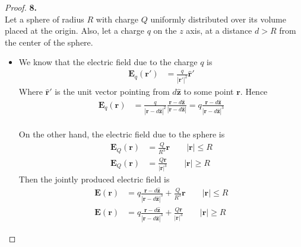 \documentclass[11pt]{article}
\newcommand{\hatz}{\bm{\hat{z}}}
\newcommand{\hatr}{\bm{\hat{r}}}
\theoremstyle{definition}
\begin{document}
\cleardoublepage
\begin{proof}{\textbf{8.}}\\
Let a sphere of radius $R$ with charge $Q$ uniformly distributed over its
volume placed at the origin. Also, let a charge $q$ on the $z$ axis, at a
distance $d > R$ from the center of the sphere.
\begin{itemize}
\item [(a)] We know that the electric field due to the charge $q$ is
\begin{align*}
    \bm{E}_q(\bm{r}') &= \frac{q}{|\bm{r}'|^2}\hatr'
\end{align*}
Where $\hatr'$ is the unit vector pointing from $d\hatz$ to some point $\bm{r}$.
Hence
\begin{align*}
    \bm{E}_q(\bm{r})
    &= \frac{q}{|\bm{r} - d\hatz|^2}\frac{\bm{r} - d\hatz}{|\bm{r} - d\hatz|}
    = q\frac{\bm{r} - d\hatz}{|\bm{r} - d\hatz|^3}
\end{align*}
\\
On the other hand, the electric field due to the sphere is
\begin{align*}
    \bm{E}_Q(\bm{r}) &= \frac{Q}{R^3}\bm{r} \qquad |\bm{r}| \leq R\\
    \bm{E}_Q(\bm{r}) &= \frac{Q\bm{r}}{|\bm{r}|^3} \qquad |\bm{r}| \geq R
\end{align*}
Then the jointly produced electric field is 
\begin{align*}
    \bm{E}(\bm{r})
    &= q\frac{\bm{r} - d\hatz}{|\bm{r} - d\hatz|^3} + \frac{Q}{R^3}\bm{r}
    \qquad |\bm{r}| \leq R\\
    \bm{E}(\bm{r})
    &= q\frac{\bm{r} - d\hatz}{|\bm{r} - d\hatz|^3}
    + \frac{Q\bm{r}}{|\bm{r}|^3} \qquad |\bm{r}| \geq R
\end{align*}


\end{itemize}
\end{proof}
\end{document}
